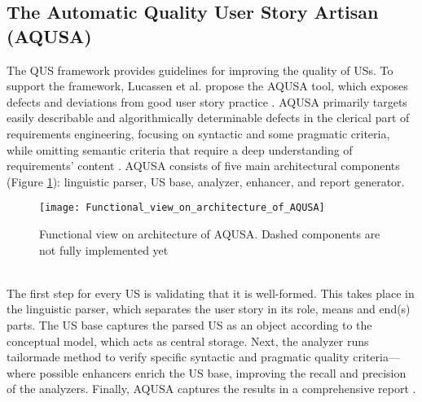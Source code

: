 \subsection{The Automatic Quality User Story Artisan (AQUSA)} \label{usq_4}
The QUS framework provides guidelines for improving the quality of USs. To support the framework, Lucassen et al. propose the AQUSA tool, which exposes defects and deviations from good user story practice \cite{lucassen2016improving}. AQUSA primarily targets easily describable and algorithmically determinable defects in the clerical part of requirements engineering, focusing on syntactic and some pragmatic criteria, while omitting semantic criteria that require a deep understanding of requirements' content \cite{lucassen2016improving}.
AQUSA consists of five main architectural components (Figure \ref{fig:aqusa}): linguistic parser, US base, analyzer, enhancer, and report generator.
\begin{figure}
\center
\texttt{[image: Functional\_view\_on\_architecture\_of\_AQUSA]}
\caption{Functional view on architecture of AQUSA. Dashed components are not fully implemented yet \cite{lucassen2016improving}}\label{fig:aqusa}
\end{figure} \\ 

The first step for every US is validating that it is well-formed. This takes place in the linguistic parser, which separates the user story in its role, means and end(s) parts. The US base captures the parsed US as an object according to the conceptual model, which acts as central storage.  Next, the analyzer runs tailormade method to verify specific syntactic and pragmatic quality criteria—where possible enhancers enrich the US base, improving the recall and precision of the analyzers. Finally, AQUSA captures the results in a comprehensive report \cite{lucassen2016improving}.

